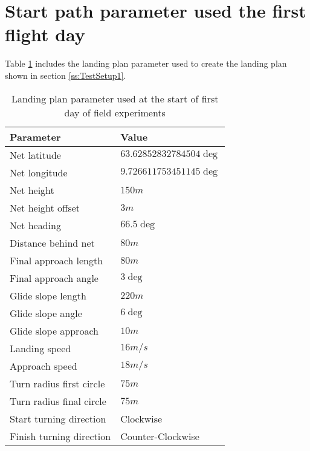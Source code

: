 \section{Start path parameter used the first flight day}\label{AP:SpecDay1}
Table \ref{AP:TB:landingDay1} includes the landing plan parameter used to create the landing plan shown in section \ref{ss:TestSetup1}.
\newpage
\begin{table}[H]
\centering
\begin{tabular}{| p{4cm} | p{4cm} |}
\hline
\textbf{Parameter}			& \textbf{Value}			\\ \hline
Net latitude				& $63.62852832784504 \deg$ 	\\ \hline
Net longitude				& $9.726611753451145 \deg$ 	\\ \hline
Net height					& $150 m$					\\ \hline
Net height offset			& $3 m$ 	\\ \hline
Net heading					& $66.5 \deg$				\\ \hline
Distance behind net			& $80 m$					\\ \hline
Final approach length		& $80 m$					\\ \hline
Final approach angle		& $3 \deg$					\\ \hline
Glide slope length			& $220 m $					\\ \hline
Glide slope angle			& $6 \deg$					\\ \hline
Glide slope approach		& $10 m$					\\ \hline
Landing speed				& $16 m/s$					\\ \hline
Approach speed				& $18 m/s$					\\ \hline
Turn radius first circle	& $75 m$					\\ \hline
Turn radius final circle	& $75 m$					\\ \hline
Start turning direction		& Clockwise					\\ \hline
Finish turning direction	& Counter-Clockwise			\\ \hline
\end{tabular}
\caption{Landing plan parameter used at the start of first day of field experiments}
\label{AP:TB:landingDay1}
\end{table}
